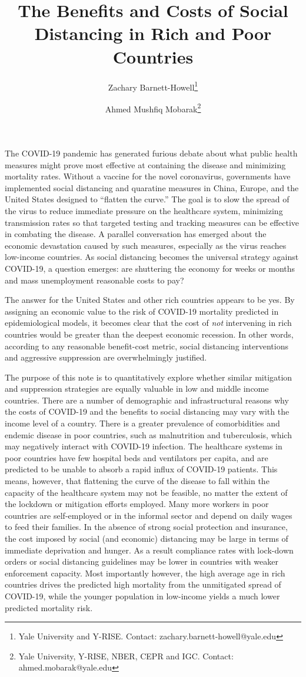 \documentclass[11pt]{article}
\author{Zachary Barnett-Howell\thanks{Yale University and Y-RISE. Contact: zachary.barnett-howell@yale.edu} \and Ahmed Mushfiq Mobarak\thanks{Yale University, Y-RISE, NBER, CEPR and IGC. Contact: ahmed.mobarak@yale.edu} }
\title{The Benefits and Costs of Social Distancing in Rich and Poor Countries}
\begin{document}
\maketitle


\doublespacing

The COVID-19 pandemic has generated furious debate about what public health measures might prove most effective at containing the disease and minimizing mortality rates. Without a vaccine for the novel coronavirus, governments have implemented social distancing and quaratine measures in China, Europe, and the United States designed to ``flatten the curve.'' The goal is to slow the spread of the virus to reduce immediate pressure on the healthcare system, minimizing transmission rates so that targeted testing and tracking measures can be effective in combating the disease. A parallel conversation has emerged about the economic devastation caused by such measures, especially as the virus reaches low-income countries. As social distancing becomes the universal strategy against COVID-19, a question emerges: are shuttering the economy for weeks or months and mass unemployment reasonable costs to pay? 

The answer for the United States and other rich countries appears to be yes. By assigning an economic value to the risk of COVID-19 mortality predicted in epidemiological models, it becomes clear that the cost of \textit{not} intervening in rich countries would be greater than the deepest economic recession. In other words, according to any reasonable benefit-cost metric, social distancing interventions and aggressive suppression are overwhelmingly justified.

The purpose of this note is to quantitatively explore whether similar mitigation and suppression strategies are equally valuable in low and middle income countries. There are a number of demographic and infrastructural reasons why the costs of COVID-19 and the benefits to social distancing may vary with the income level of a country. There is a greater prevalence of comorbidities and endemic disease in poor countries, such as malnutrition and tuberculosis, which may negatively interact with COVID-19 infection. The healthcare systems in poor countries have few hospital beds and ventilators per capita, and are predicted to be unable to absorb a rapid influx of COVID-19 patients. This means, however, that flattening the curve of the disease to fall within the capacity of the healthcare system may not be feasible, no matter the extent of the lockdown or mitigation efforts employed. Many more workers in poor countries are self-employed or in the informal sector and depend on daily wages to feed their families. In the absence of strong social protection and insurance, the cost imposed by social (and economic) distancing may be large in terms of immediate deprivation and hunger. As a result compliance rates with lock-down orders or social distancing guidelines may be lower in countries with weaker enforcement capacity. Most importantly however, the high average age in rich countries drives the predicted high mortality from the unmitigated spread of COVID-19, while the younger population in low-income yields a much lower predicted mortality risk.
\end{document}
